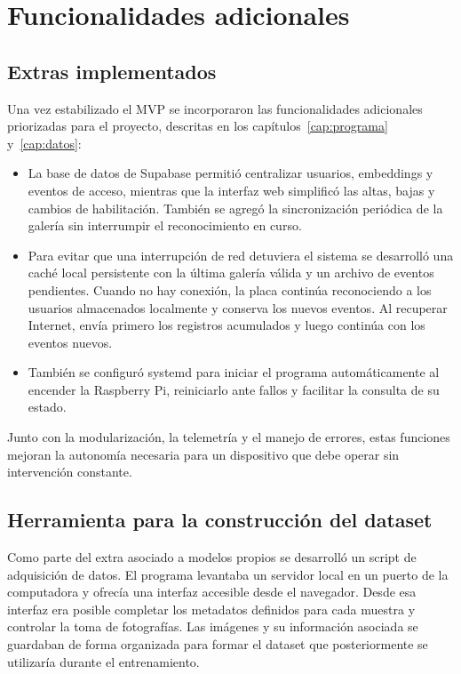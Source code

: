 \section{Funcionalidades adicionales}

\subsection{Extras implementados}

Una vez estabilizado el MVP se incorporaron las funcionalidades adicionales priorizadas para el proyecto, descritas en los capítulos~\ref{cap:programa} y~\ref{cap:datos}:

\begin{itemize}
    \item La base de datos de Supabase permitió centralizar usuarios, embeddings y eventos de acceso, mientras que la interfaz web simplificó las altas, bajas y cambios de habilitación. También se agregó la sincronización periódica de la galería sin interrumpir el reconocimiento en curso.
    \item Para evitar que una interrupción de red detuviera el sistema se desarrolló una caché local persistente con la última galería válida y un archivo de eventos pendientes. Cuando no hay conexión, la placa continúa reconociendo a los usuarios almacenados localmente y conserva los nuevos eventos. Al recuperar Internet, envía primero los registros acumulados y luego continúa con los eventos nuevos.
    \item También se configuró systemd para iniciar el programa automáticamente al encender la Raspberry Pi, reiniciarlo ante fallos y facilitar la consulta de su estado.
\end{itemize}

Junto con la modularización, la telemetría y el manejo de errores, estas funciones mejoran la autonomía necesaria para un dispositivo que debe operar sin intervención constante.

\subsection{Herramienta para la construcción del dataset}

Como parte del extra asociado a modelos propios se desarrolló un script de adquisición de datos. El programa levantaba un servidor local en un puerto de la computadora y ofrecía una interfaz accesible desde el navegador. Desde esa interfaz era posible completar los metadatos definidos para cada muestra y controlar la toma de fotografías. Las imágenes y su información asociada se guardaban de forma organizada para formar el dataset que posteriormente se utilizaría durante el entrenamiento.

